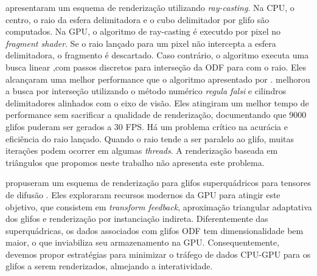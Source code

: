 \documentclass[
    12pt,                %
    oneside,            %
    a4paper,            %
    english,            %
    french,                %
    spanish,            %
    brazil                %
    ]{abntex2}
\begin{document}
 apresentaram um esquema de renderização utilizando \textit{ray-casting}. Na CPU, o centro, o raio da esfera delimitadora e o cubo delimitador por glifo são computados. Na GPU, o algoritmo de ray-casting é executdo por pixel no \textit{fragment shader}. Se o raio lançado para um pixel não intercepta a esfera delimitadora, o fragmento é descartado. Caso contrário, o algoritmo executa uma busca linear ,com passos discretos para interseção da ODF para com o raio. Eles alcançaram uma melhor performance que o algoritmo apresentado por .  melhorou a busca por interseção utilizando o método numérico \textit{regula falsi} e cilindros delimitadores alinhados com o eixo de visão. Eles atingiram um melhor tempo de performance sem sacrificar a qualidade de renderização, documentando que 9000 glifos puderam ser gerados a 30 FPS. Há um problema crítico na acurácia e eficiência do raio lançado. Quando o raio tende a ser paralelo ao glifo, muitas iterações podem ocorrer em algumas \textit{threads}. A renderização baseada em triângulos que propomos neste trabalho não apresenta este problema. 

 propuseram um esquema de renderização para glifos superquádricos para tensores de difusão \cite{Kindlmann2004}. Eles exploraram recursos modernos da GPU para atingir este objetivo, que consistem em \textit{transform feedback}, aproximação triangular adaptativa dos glifos e renderização por instanciação indireta. Diferentemente das superquádricas, os dados associados com glifos ODF tem dimensionalidade bem maior, o que inviabiliza seu armazenamento na GPU. Consequentemente, devemos propor estratégias para minimizar o tráfego de dados CPU-GPU para os glifos a serem renderizados, almejando a interatividade.




\end{document}
